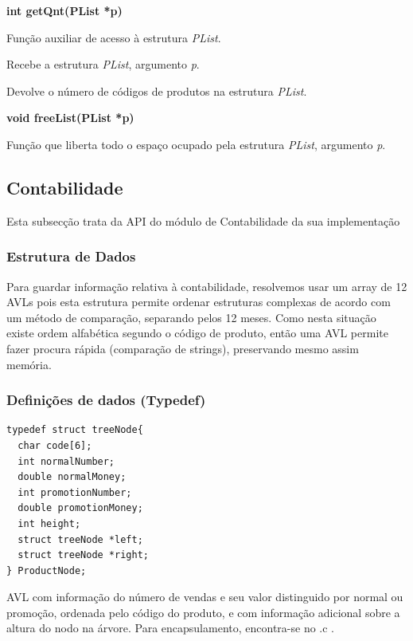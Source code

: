 \documentclass[10pt] {article}
\begin{document}
\noindent \textbf{int getQnt(PList *p)}
\par Função auxiliar de acesso à estrutura \emph{PList}.
\par Recebe a estrutura \emph{PList}, argumento \emph{p}.
\par Devolve o número de códigos de produtos na estrutura \emph{PList}.

\noindent \textbf{void freeList(PList *p)}
\par Função que liberta todo o espaço ocupado pela estrutura \emph{PList}, argumento \emph{p}.



\newpage
\subsection{Contabilidade}
\par Esta subsecção trata da API do módulo de Contabilidade da sua implementação

\subsubsection{Estrutura de Dados}
\par
Para guardar informação relativa à contabilidade, resolvemos usar um array de 12 AVLs pois esta estrutura permite ordenar estruturas complexas de acordo com um método de comparação, separando pelos 12 meses. Como nesta situação existe ordem alfabética segundo o código de produto, então uma AVL permite fazer procura rápida (comparação de strings), preservando mesmo assim memória.

\subsubsection{Definições de dados (Typedef)}

\begin{lstlisting}
typedef struct treeNode{
  char code[6];
  int normalNumber;
  double normalMoney;
  int promotionNumber;
  double promotionMoney;
  int height;
  struct treeNode *left;
  struct treeNode *right;
} ProductNode;
\end{lstlisting}

\par AVL com informação do número de vendas e seu valor distinguido por normal ou promoção, ordenada pelo código do produto, e com informação adicional sobre a altura do nodo na árvore. Para encapsulamento, encontra-se no .c .
\end{document}
